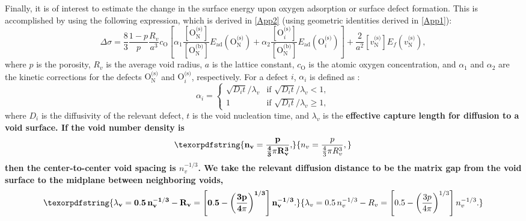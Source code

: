 \documentclass[preprint,12pt,sort&compress]{elsarticle}
\newcommand{\?}{\stackrel{?}{=}}
\providecommand{\DIFaddtex}[1]{{\bf #1}} %
\providecommand{\DIFdeltex}[1]{} %
\providecommand{\DIFaddbegin}{\protect\color{blue}} %
\providecommand{\DIFdelbegin}{\protect\color{red}} %
\providecommand{\DIFdelend}{\protect\color{black}} %
\providecommand{\DIFadd}[1]{\texorpdfstring{\DIFaddtex{#1}}{#1}} %
\providecommand{\DIFdel}[1]{\texorpdfstring{\DIFdeltex{#1}}{}} %
\begin{document}
Finally, it is of interest to estimate the change in the surface energy upon oxygen adsorption or surface defect formation. This is accomplished by using the following expression, which is derived in \ref{App2} (using geometric identities derived in \ref{App1}):
\begin{equation}
\Delta \sigma = \frac{8}{3} \frac{1-p}{p} \frac{R_v}{a^3} c_\text{O} \left[ \alpha_1 \frac{ [ \text{O}_\text{N}^{\text{(s)}} ] }{ [ \text{O}_\text{N}^{\text{(b)}} ] }  E_\text{ad}( \text{O}_\text{N}^{\text{(s)}} ) + \alpha_2 \frac{ [ \text{O}_i^{\text{(s)}} ] }{ [ \text{O}_\text{N}^{\text{(b)}} ] }  E_\text{ad}( \text{O}_i^{\text{(s)}} ) \right] + \frac{2}{a^2} [ v_\text{N}^{\text{(s)}} ] E_f ( v_\text{N}^{\text{(s)}} ),
\label{Eq:DeltaSigma1}
\end{equation}
where $p$ is the porosity, $R_v$ is the average void radius, $a$ is the lattice constant, $c_\text{O}$ is the atomic oxygen concentration, and $\alpha_1$ and $\alpha_2$ are the kinetic corrections for the defects $\text{O}_\text{N}^\text{(s)}$ and $\text{O}_i^{\text{(s)}}$, respectively. \DIFdelbegin \DIFdel{Note that \cref{Eq:DeltaSigma1} predicts that the surface energy reduction scales linearly with oxygen concentration. }\DIFdelend For a defect $i$, $\alpha_i$ is defined as \cite{Zinkle1990}:
\begin{equation}
\alpha_i =
\begin{cases}
    \sqrt{D_i t}/\lambda_v & \text{if } \sqrt{D_i t}/\lambda_v < 1, \\
    1 & \text{if } \sqrt{D_i t}/\lambda_v \geq 1,
\end{cases}
\label{Eq:alpha}
\end{equation}
where $D_i$ is the diffusivity of the relevant defect, $t$ is the void nucleation time, and $\lambda_v$ is the \DIFdelbegin \DIFdel{mean free path between voids, defined as $\lambda_v = n_v^{-1/3}$, where $n_v = p / ( \frac{4}{3} \pi R_v^3 )$ is the void number density}\DIFdelend \DIFaddbegin \DIFadd{effective capture length for diffusion to a void surface. If the void number density is
}\begin{equation}
\DIFadd{n_v = \frac{p}{\frac{4}{3}\pi R_v^3},
}\end{equation}
\DIFadd{then the center-to-center void spacing is $n_v^{-1/3}$. We take the relevant diffusion distance to be the matrix gap from the void surface to the midplane between neighboring voids,
}\begin{equation}
\DIFadd{\lambda_v
=
0.5\,n_v^{-1/3} - R_v
=
\left[0.5-\left(\frac{3p}{4\pi}\right)^{1/3}\right]n_v^{-1/3}.
\label{Eq:lambda_eff}
}\end{equation}
\end{document}
